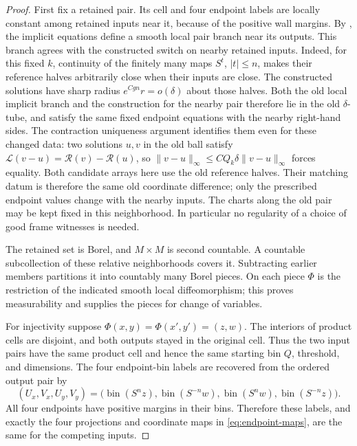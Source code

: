 \begin{proof}
First fix a retained pair.  Its cell and four endpoint labels are
locally constant among retained inputs near it, because of the positive
wall margins.  By , the implicit equations
define a smooth local pair branch near its outputs.  This branch
agrees with the constructed switch on nearby retained inputs.
Indeed, for this fixed $k$, continuity of the finitely many maps
$S^t$, $|t|\le n$, makes their reference halves arbitrarily close
when their inputs are close.  The constructed solutions have sharp
radius $e^{Cgn}r=o(\delta)$ about those halves.  Both the old local
implicit branch and the construction for the nearby pair therefore
lie in the old $\delta$-tube, and satisfy the same fixed endpoint
equations with the nearby right-hand sides.  The contraction uniqueness
argument identifies them even for these changed data: two solutions
$u,v$ in the old ball satisfy
$\mathcal L(v-u)=\mathcal R(v)-\mathcal R(u)$, so
$\|v-u\|_\infty\le CQ_k\delta\|v-u\|_\infty$ forces equality.
Both candidate arrays here use the old reference halves. Their
matching datum is therefore the same old coordinate difference;
only the prescribed endpoint values change with the nearby inputs.
The charts along the old pair may be kept fixed in this neighborhood.  In particular no regularity of a choice of good
frame witnesses is needed.

The retained set is Borel, and $M\times M$ is second countable.
A countable subcollection of these relative neighborhoods covers it.
Subtracting earlier members partitions it into countably many Borel
pieces.  On each piece $\Phi$ is the restriction of the indicated
smooth local diffeomorphism; this proves measurability and supplies
the pieces for change of variables.

For injectivity suppose
$\Phi(x,y)=\Phi(x',y')=(z,w)$.  The interiors of product cells are
disjoint, and both outputs stayed in the original cell.  Thus the
two input pairs have the same product cell and hence the same starting
bin $Q$, threshold, and dimensions.  The four endpoint-bin labels
are recovered from the ordered output pair by
\begin{equation}\label{eq:recovered-bin-labels}
 (U_x,V_x,U_y,V_y)=
 \bigl(\operatorname{bin}(S^nz),\operatorname{bin}(S^{-n}w),
       \operatorname{bin}(S^nw),\operatorname{bin}(S^{-n}z)\bigr).
\end{equation}
All four endpoints have positive margins in their bins.  Therefore
these labels, and exactly the four projections and coordinate maps in
\eqref{eq:endpoint-maps}, are the same for the competing inputs.


\end{proof}
